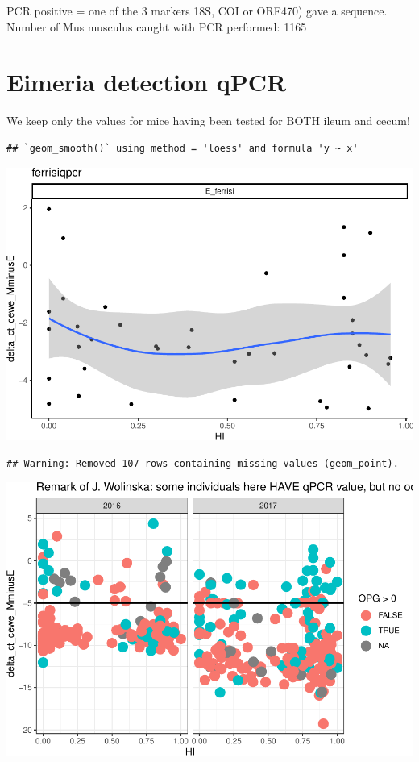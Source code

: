\documentclass[]{article}
\begin{document}
PCR positive = one of the 3 markers 18S, COI or ORF470) gave a sequence.
Number of Mus musculus caught with PCR performed: 1165

\section{Eimeria detection qPCR}\label{eimeria-detection-qpcr}

We keep only the values for mice having been tested for BOTH ileum and
cecum!

\begin{verbatim}
## `geom_smooth()` using method = 'loess' and formula 'y ~ x'
\end{verbatim}

\includegraphics{Data_Analysis_Alice_files/figure-latex/qpcr-1.pdf}

\begin{verbatim}
## Warning: Removed 107 rows containing missing values (geom_point).
\end{verbatim}

\includegraphics{Data_Analysis_Alice_files/figure-latex/qpcr-2.pdf}
\end{document}
